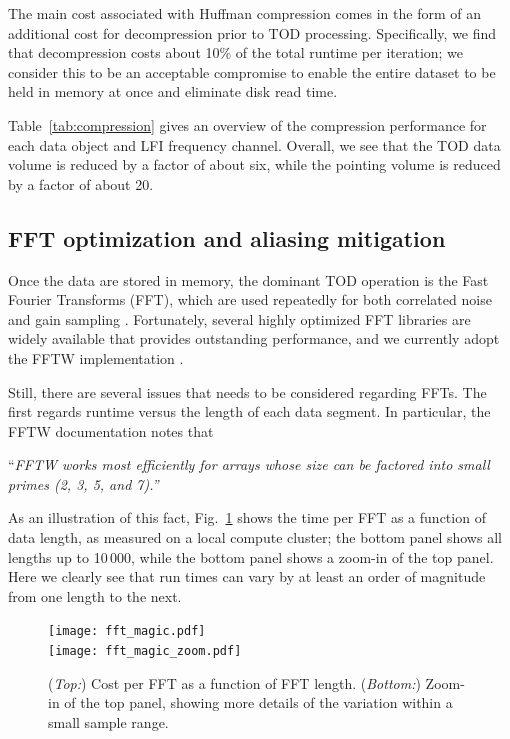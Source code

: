 \documentclass[twocolumn]{aa}
\begin{document}
The main cost associated with Huffman compression comes in the form of
an additional cost for decompression prior to TOD
processing. Specifically, we find that decompression costs about 10\%
of the total runtime per iteration; we consider this to be an
acceptable compromise to enable the entire dataset to be held in
memory at once and eliminate disk read time.

Table~\ref{tab:compression} gives an overview of the compression
performance for each data object and LFI frequency channel. Overall,
we see that the TOD data volume is reduced by a factor of about six,
while the pointing volume is reduced by a factor of about 20. 

\subsection{FFT optimization and aliasing mitigation}

Once the data are stored in memory, the dominant TOD operation is
the Fast Fourier Transforms (FFT), which are used repeatedly for both
correlated noise and gain sampling \citep{BP06,BP07}. Fortunately,
several highly optimized FFT libraries are widely available that
provides outstanding performance, and we currently adopt the FFTW
implementation \citep{FFTW05}.

Still, there are several issues that needs to be considered regarding
FFTs. The first regards runtime versus the length of each data
segment. In particular, the FFTW documentation notes that
\begin{displayquote}
``\emph{FFTW works most efficiently for arrays whose size can be factored into small primes (2, 3, 5, and 7).''}
\end{displayquote}
As an illustration of this fact, Fig.~\ref{fig:fftw} shows the time
per FFT as a function of data length, as measured on a local compute
cluster; the bottom panel shows all lengths up to 10\,000, while the
bottom panel shows a zoom-in of the top panel. Here we clearly see
that run times can vary by at least an order of magnitude from one
length to the next.

\begin{figure}[t]
  \center
  \texttt{[image: fft\_magic.pdf]}\\
  \texttt{[image: fft\_magic\_zoom.pdf]}
  \caption{(\emph{Top:}) Cost per FFT as a function of FFT
    length. (\emph{Bottom:}) Zoom-in of the top panel, showing more
    details of the variation within a small sample range.
  }\label{fig:fftw}
\end{figure}
\end{document}
